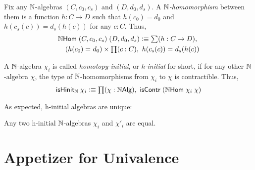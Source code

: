 \begin{defn}
Fix any $\mathbb{N}$-algebras $(C,c_0,c_s)$ and $(D,d_0,d_s)$. A \emph{$\mathbb{N}$-homomorphism} between them is a function $h : C \to D$ such that $h(c_0) = d_0$ and $h(c_s(c)) = d_s(h(c))$ for any $c : C$. Thus,
\begin{align*}
\nhom \; (C,c_0,c_s) \; (D,d_0,d_s) \defeq \sm {h : C \to D} \\ (\id{h(c_0)}{d_0}) \times \prd{c:C} \id{h(c_s(c))}{d_s(h(c))}
\end{align*}
\end{defn}

\begin{defn}
A $\mathbb{N}$-algebra $\chi_i$ is called \emph{homotopy-initial}, or \emph{h-initial} for short, if for any other $\mathbb{N}$-algebra $\chi$, the type of $\mathbb{N}$-homomorphisms from $\chi_i$ to $\chi$ is contractible. Thus,
\begin{align*}
\ishinitn \; \chi_i \defeq \prd{\chi : \nalg} \iscontr \; (\nhom \; \chi_i\; \chi)
\end{align*}
\end{defn}

As expected, h-initial algebras are unique:
\begin{thm}
Any two h-initial $\mathbb{N}$-algebras $\chi_i$ and $\chi'_i$ are equal.
\end{thm}


\section{Appetizer for Univalence}
\label{sec:appetizer-univalence}

\newcommand{\natp}{\ensuremath{\mathbf{N'}}\xspace}
\newcommand{\zp}{\ensuremath{0'}\xspace}
\newcommand{\Sp}{\ensuremath{\mathbf{s'}}\xspace}
\newcommand{\dblp}{\ensuremath{\mathbf{double'}}}

